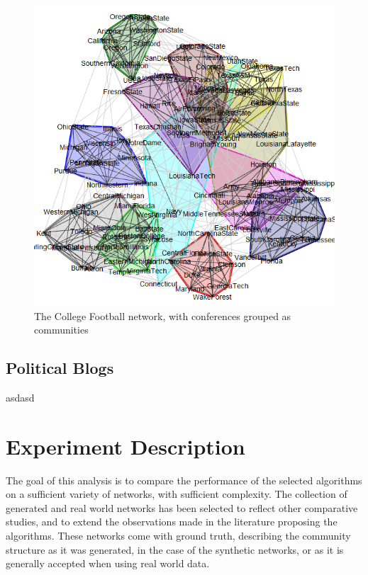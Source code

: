 \cite{Girvan2002}
\begin{figure}[!htb]
	\begin{center}
		\includegraphics[scale=.5]{images/football.png}
	\end{center}
	\caption{The College Football network, with conferences grouped as communities}
	\label{logo}
\end{figure}


\subsection{Political Blogs}
\cite{Adamic2005}
asdasd


\section{Experiment Description}
The goal of this analysis is to compare the performance of the selected algorithms on a sufficient variety of networks, with sufficient complexity. The collection of generated and real world networks has been selected to reflect other comparative studies, and to extend the observations made in the literature proposing the algorithms. These networks come with ground truth, describing the community structure as it was generated, in the case of the synthetic networks, or as it is generally accepted when using real world data.

